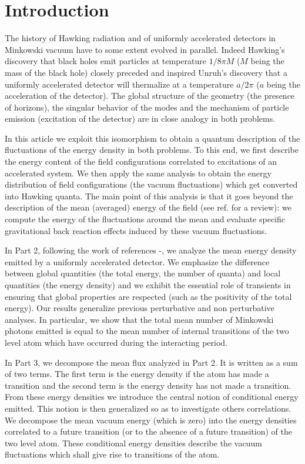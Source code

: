 \section{Introduction}\label{Intro}


The history of Hawking radiation and of uniformly accelerated detectors in
Minkowski vacuum have to some extent evolved in parallel. Indeed
Hawking's discovery\cite{hawk2} that black holes emit particles at
temperature $1/8\pi M$ ($M$ being the mass of the black hole)
 closely preceded and inspired Unruh's
discovery\cite{Unruh} that a uniformly accelerated detector will thermalize at
a
temperature $a/2\pi $ ($a$ being the acceleration of the detector).
The global structure of the geometry (the
presence of horizons), the singular behavior of the modes and the mechanism of
particle emission (excitation of the detector) are in close analogy in both
problems.

In this article we exploit this isomorphism to obtain a quantum description
of the fluctuations of the energy density in both problems. To this end,
we first describe the energy content of the
field configurations correlated to excitations of
an accelerated system.
We then apply the same analysis to obtain
the energy distribution of field
configurations (the vacuum fluctuations) which get converted into Hawking
quanta. The main point of this analysis is that it
goes beyond the description of the mean (averaged) energy of the field (see
ref. \cite{birreld} for a review): we compute the energy of the
fluctuations around the mean
and evaluate specific gravitational back reaction effects
induced by these vacuum fluctuations.

In Part 2,
following the work of references
\cite{Unruh}\cite{UnWa}-\cite{AM},
we analyze the mean energy density emitted by a uniformly
accelerated detector.
We
emphasize
the difference between global quantities (the total energy, the number of
quanta) and local quantities (the energy density) and we exhibit the essential
role of transients in ensuring that global properties are respected
(such as the positivity of the total energy).
Our results generalize previous perturbative\cite{AM} and
non perturbative\cite{Unru2} analyses. In particular, we  show that the
total mean number of Minkowski photons emitted is equal to the mean number of
internal transitions of the two level atom which have occurred during
the interacting period.

In Part 3, we decompose the mean flux analyzed in Part 2.
 It is written as a sum of two terms\cite{UnWa}\cite{Grove}\cite{AM}.
The first term is the energy density  if the atom has made a transition
and the second term is the energy density has not
made a transition. From these energy densities we introduce the central notion
of  conditional
energy emitted. This notion is then generalized so as to investigate others
correlations.
We
decompose the mean vacuum energy (which is zero) into the energy densities
correlated to a future transition (or to the absence of a future transition)
of the two level atom.
These conditional
energy densities describe the vacuum fluctuations
which shall give rise to transitions of the atom.


